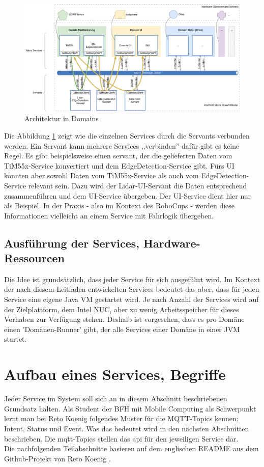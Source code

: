 \begin{figure}[H]
	\centering
	\includegraphics[width=\textwidth]{img/architecture-highlevel.pdf}
	\caption{Architektur in Domains}
	\label{fig:architecture_highlevel}
\end{figure}

Die Abbildung \ref{fig:architecture_highlevel} zeigt wie die einzelnen Services durch die Servants verbunden werden. Ein Servant kann mehrere Services ,,verbinden'' dafür gibt es keine Regel. Es gibt beispielsweise einen \Gls{servant}, der die gelieferten Daten vom TiM55x-Service konvertiert und dem EdgeDetection-Service gibt. Fürs UI könnten aber sowohl Daten vom TiM55x-Service als auch vom EdgeDetection-Service relevant sein. Dazu wird der Lidar-UI-Servant die Daten entsprechend zusammenführen und dem UI-Service übergeben. Der UI-Service dient hier nur als Beispiel. In der Praxis - also im Kontext des RoboCups - werden diese Informationen vielleicht an einem Service mit Fahrlogik übergeben.

\subsection{Ausführung der Services, Hardware-Ressourcen}
Die Idee ist grundsätzlich, dass jeder Service für sich ausgeführt wird. Im Kontext der nach diesem Leitfaden entwickelten Services bedeutet das aber, dass für jeden Service eine eigene Java VM gestartet wird. Je nach Anzahl der Services wird auf der Zielplattform, dem Intel NUC, aber zu wenig Arbeitsspeicher für dieses Vorhaben zur Verfügung stehen. Deshalb ist vorgesehen, dass es pro Domäne einen 'Domänen-Runner' gibt, der alle Services einer Domäne in einer JVM startet.

\section{Aufbau eines Services, Begriffe}
\label{sec:isePattern}
Jeder Service im System soll sich an in diesem Abschnitt beschriebenen Grundsatz halten. Als Student der BFH mit Mobile Computing als Schwerpunkt lernt man bei Reto Koenig folgendes Muster für die MQTT-Topics kennen: Intent, Status und Event. Was das bedeutet wird in den nächsten Abschnitten beschrieben. Die \acrshort{mqtt}-Topics stellen das \acrshort{api} für den jeweiligen Service dar. \\ Die nachfolgenden Teilabschnitte basieren auf dem englischen README aus dem Github-Projekt von Reto Koenig \cite{ch.quantasy.mqtt.gateway}.

